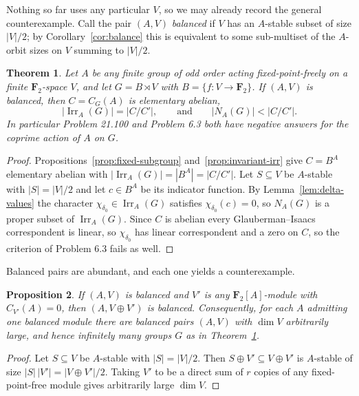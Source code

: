 \documentclass[11pt]{article}
\newtheorem{theorem}{Theorem}[section]
\newtheorem{proposition}[theorem]{Proposition}
\theoremstyle{definition}
\theoremstyle{remark}
\newcommand{\F}{\mathbf F}
\newcommand{\Irr}{\operatorname{Irr}}
\begin{document}
Nothing so far uses any particular $V$, so we may already record the
general counterexample.  Call the pair $(A,V)$ \emph{balanced} if $V$
has an $A$-stable subset of size $|V|/2$; by
Corollary~\ref{cor:balance} this is equivalent to some sub-multiset of
the $A$-orbit sizes on $V$ summing to $|V|/2$.

\begin{theorem}\label{thm:general}
Let $A$ be any finite group of odd order acting fixed-point-freely on a
finite $\F_2$-space $V$, and let $G=B\rtimes V$ with
$B=\{f:V\to\F_2\}$.  If
$(A,V)$ is balanced, then $C=C_G(A)$ is elementary abelian,
\[
 |\Irr_A(G)|=|C/C'|,
 \qquad\text{and}\qquad
 |N_A(G)|<|C/C'| .
\]
In particular Problem 21.100 and Problem 6.3 both have negative
answers for the coprime action of $A$ on $G$.
\end{theorem}

\begin{proof}
Propositions~\ref{prop:fixed-subgroup} and~\ref{prop:invariant-irr} give
$C=B^A$ elementary abelian with $|\Irr_A(G)|=|B^A|=|C/C'|$.  Let
$S\subseteq V$ be $A$-stable with $|S|=|V|/2$ and let $c\in B^A$ be its
indicator function.  By Lemma~\ref{lem:delta-values} the character
$\chi_{\delta_0}\in\Irr_A(G)$ satisfies $\chi_{\delta_0}(c)=0$, so
$N_A(G)$ is a proper subset of $\Irr_A(G)$.  Since $C$ is abelian every
Glauberman--Isaacs correspondent is linear, so $\chi_{\delta_0}$ has
linear correspondent and a zero on $C$, so the criterion of Problem 6.3 fails as well.
\end{proof}

Balanced pairs are abundant, and each one yields a counterexample.

\begin{proposition}\label{prop:infinitely-many}
If $(A,V)$ is balanced and $V'$ is any $\F_2[A]$-module with
$C_{V'}(A)=0$, then $(A,V\oplus V')$ is balanced.  Consequently, for
each $A$ admitting one balanced module there are balanced pairs
$(A,V)$ with $\dim V$ arbitrarily large, and hence infinitely many
groups $G$ as in Theorem~\ref{thm:general}.
\end{proposition}

\begin{proof}
Let $S\subseteq V$ be $A$-stable with $|S|=|V|/2$.  Then
$S\oplus V'\subseteq V\oplus V'$ is $A$-stable of size
$|S|\,|V'|=|V\oplus V'|/2$.  Taking $V'$ to be a direct sum of $r$
copies of any fixed-point-free module gives arbitrarily large $\dim V$.
\end{proof}
\end{document}
